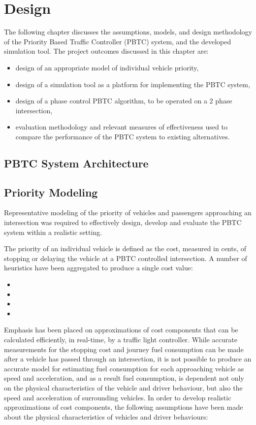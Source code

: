 \chapter{Design}

The following chapter discusses the assumptions, models, and design methodology of the Priority Based Traffic Controller (PBTC) system, and the developed simulation tool. The project outcomes discussed in this chapter are:

\begin{itemize}
\item design of an appropriate model of individual vehicle priority,
\item design of a simulation tool as a platform for implementing the PBTC system,
\item design of a phase control PBTC algorithm, to be operated on a 2 phase intersection,
\item evaluation methodology and relevant measures of effectiveness used to compare the performance of the PBTC system to existing alternatives.
\end{itemize}

\section{PBTC System Architecture}

\section{Priority Modeling}

Representative modeling of the priority of vehicles and passengers approaching an intersection was required to effectively design, develop and evaluate the PBTC system within a realistic setting. 

The priority of an individual vehicle is defined as the cost, measured in cents, of stopping or delaying the vehicle at a PBTC controlled intersection. A number of heuristics have been aggregated to produce a single cost value:

\begin{itemize}
\item 
\item 
\item 
\item 
\end{itemize}

Emphasis has been placed on approximations of cost components that can be calculated efficiently, in real-time, by a traffic light controller. While accurate measurements for the stopping cost and journey fuel consumption can be made after a vehicle has passed through an intersection, it is not possible to produce an accurate model for estimating fuel consumption for each approaching vehicle as speed and acceleration, and as a result fuel consumption, is dependent not only on the physical characteristics of the vehicle and driver behaviour, but also the speed and acceleration of surrounding vehicles. In order to develop realistic approximations of cost components, the following assumptions have been made about the physical characteristics of vehicles and driver behaviours:

